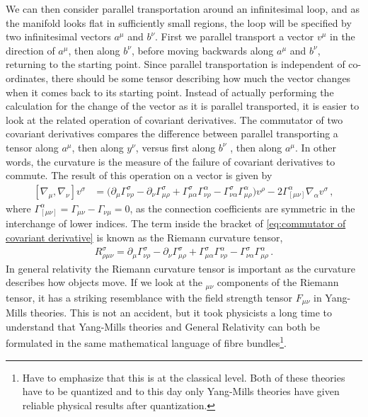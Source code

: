 We can then consider parallel transportation around an infinitesimal loop, and as the manifold looks flat in sufficiently small regions, the loop will be specified by two infinitesimal vectors $a^{\mu}$ and $b^{\nu}$. First we parallel transport a vector $v^{\mu}$ in the direction of $a^{\mu}$, then along $b^{\nu}$, before moving backwards along $a^{\mu}$ and $b^{\nu}$, returning to the starting point. Since parallel transportation is independent of co-ordinates, there should be some tensor describing how much the vector changes when it comes back to its starting point. Instead of actually performing the calculation for the change of the vector as it is parallel transported, it is easier to look at the related operation of covariant derivatives. The commutator of two covariant derivatives compares the difference between parallel transporting a tensor along $a^{\mu}$, then along $y^{\nu}$, versus first along $b^{\nu}$ , then along $a^{\mu}$. In other words, the curvature is the measure of the failure of covariant derivatives to commute. The result of this operation on a vector is given by
\begin{align}\label{eq:commutator of covariant derivative}
    [\nabla_{\mu},\nabla_{\nu}]v^{\sigma}&=\big(\partial_{\mu}\Gamma^{\sigma}_{\nu\rho}-\partial_{\nu}\Gamma^{\sigma}_{\mu\rho}+\Gamma^{\sigma}_{\mu\alpha}\Gamma^{\alpha}_{\nu\rho}-\Gamma^{\sigma}_{\nu\alpha}\Gamma^{\alpha}_{\mu\rho}\big)v^{\rho}-2\Gamma^{\alpha}_{[\mu\nu]}\nabla_{\alpha}v^{\sigma}\,,
\end{align}
where $\Gamma_{[\mu\nu]}^{\alpha}=\Gamma_{\mu\nu}-\Gamma_{\nu\mu}=0$, as the connection coefficients are symmetric in the interchange of lower indices. The term inside the bracket of \cref{eq:commutator of covariant derivative} is known as the Riemann curvature tensor,
\begin{align}\label{Riemann curvature tensor}
    R^{\sigma}_{\rho\mu\nu}=\partial_{\mu}\Gamma^{\sigma}_{\nu\rho}-\partial_{\nu}\Gamma^{\sigma}_{\mu\rho}+\Gamma^{\sigma}_{\mu\alpha}\Gamma^{\alpha}_{\nu\rho}-\Gamma^{\sigma}_{\nu\alpha}\Gamma^{\alpha}_{\mu\rho}\,.
\end{align}
In general relativity the Riemann curvature tensor is important as the curvature describes how objects move. If we look at the $_{\mu\nu}$ components of the Riemann tensor, it has a striking resemblance with the field strength tensor $F_{\mu\nu}$ in Yang-Mills theories. This is not an accident, but it took physicists a long time to understand that Yang-Mills theories and General Relativity can both be formulated in the same mathematical language of fibre bundles\footnote{Have to emphasize that this is at the classical level. Both of these theories have to be quantized and to this day only Yang-Mills theories have given reliable physical results after quantization.}.

